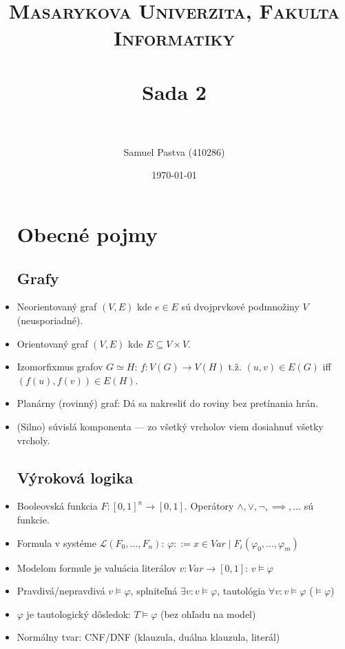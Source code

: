 \documentclass[paper=a4, fontsize=11pt]{scrartcl} %
\title{	
	\normalfont \normalsize 
	\textsc{Masarykova Univerzita, Fakulta Informatiky} \\ [25pt] %
	\horrule{0.5pt} \\[0.4cm] %
	\huge Sada 2 \\ %
	\horrule{2pt} \\[0.5cm] %
}
\author{Samuel Pastva (410286)} %
\date{\normalsize\today} %
\numberwithin{equation}{section} %
\numberwithin{figure}{section} %
\numberwithin{table}{section} %
\begin{document}
\begin{itemize}
	
	\section{Obecné pojmy}
	
	\subsection{Grafy}
	
	\item Neorientovaný graf $(V, E)$ kde $e \in E$ sú dvojprvkové podmnožiny $V$ (neusporiadné).
	
	\item Orientovaný graf $(V, E)$ kde $E \subseteq V \times V$.
	
	\item Izomorfixmus grafov $G \simeq H$: $f: V(G) \to V(H)$ t.ž. $(u,v) \in E(G)$ iff $(f(u), f(v)) \in E(H)$.
	
	\item Planárny (rovinný) graf: Dá sa nakresliť do roviny bez pretínania hrán.
	
	\item (Silno) súvislá komponenta — zo všetký vrcholov viem dosiahnuť všetky vrcholy.
	
	\subsection{Výroková logika}		
	
	\item Booleovská funkcia $F : [0,1]^n \to [0,1]$. Operátory $\land, \lor, \neg, \implies, ...$ sú funkcie. 
	
	\item Formula v systéme $\mathcal{L}(F_0, ..., F_n)$: $\varphi ::= x \in Var \mid F_i(\varphi_0, ..., \varphi_m)$
	
	\item Modelom formule je valuácia literálov $v : Var \to [0,1]$: $v \models \varphi$
	
	\item Pravdivá/nepravdivá $v \models \varphi$, splniteľná $\exists v : v \models \varphi$, tautológia $\forall v : v \models \varphi$ ($\models \varphi$)

	\item $\varphi$ je tautologický dôsledok: $T \models \varphi$ (bez ohľadu na model)
	
	\item Normálny tvar: CNF/DNF (klauzula, duálna klauzula, literál)


\end{itemize}
\end{document}
